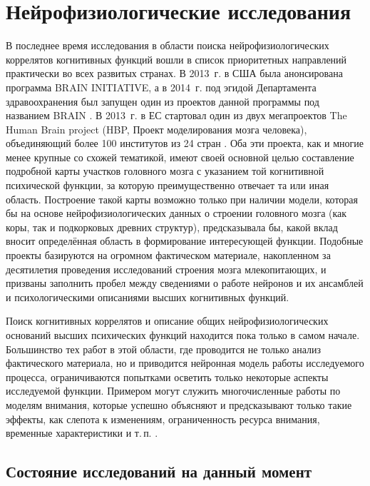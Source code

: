 \section{Нейрофизиологические исследования} \label{sect:neuro}

В последнее время исследования в области поиска нейрофизиологических коррелятов когнитивных функций вошли в список приоритетных направлений практически во всех развитых странах. В 2013~г. в США была анонсирована программа BRAIN INITIATIVE, а в 2014~г. под эгидой Департамента здравоохранения был запущен один из проектов данной программы под названием BRAIN \cite{NIH2014}. В 2013~г. в ЕС стартовал один из двух мегапроектов The Human Brain project (HBP, Проект моделирования мозга человека), объединяющий более 100 институтов из 24 стран \cite{HBP2014}. Оба эти проекта, как и многие менее крупные со схожей тематикой, имеют своей основной целью составление подробной карты участков головного мозга с указанием той когнитивной психической функции, за которую преимущественно отвечает та или иная область. Построение такой карты возможно только при наличии модели, которая бы на основе нейрофизиологических данных о строении головного мозга (как коры, так и подкорковых древних структур), предсказывала бы, какой вклад вносит определённая область в формирование интересующей функции. Подобные проекты базируются на огромном фактическом материале, накопленном за десятилетия проведения исследований строения мозга млекопитающих, и призваны заполнить пробел между сведениями о работе нейронов и их ансамблей и психологическими описаниями высших когнитивных функций. 

Поиск когнитивных коррелятов и описание общих нейрофизиологических оснований высших психических функций находится пока только в самом начале. Большинство тех работ в этой области, где проводится не только анализ фактического материала, но и приводится нейронная модель работы исследуемого процесса, ограничиваются попытками осветить только некоторые аспекты исследуемой функции. Примером могут служить многочисленные работы по моделям внимания, которые успешно объясняют и предсказывают только такие эффекты, как слепота к изменениям, ограниченность ресурса внимания, временные характеристики и т.\,п. \cite{Borji2013}.

\subsection{Состояние исследований на данный момент}


